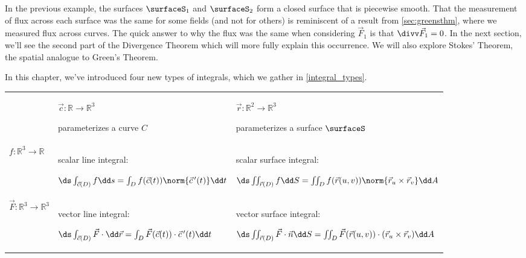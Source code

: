In the previous example, the surfaces $\surfaceS_1$ and $\surfaceS_2$ form a closed surface that is piecewise smooth. That the measurement of flux across each surface was the same for some fields (and not for others) is reminiscent of a result from \autoref{sec:greensthm}, where we measured flux across curves. The quick answer to why the flux was the same when considering $\vec F_1$ is that $\divv \vec F_1 = 0$. In the next section, we'll see the second part of the Divergence Theorem which will more fully explain this occurrence. We will also explore Stokes' Theorem, the spatial analogue to Green's Theorem.\bigskip

In this chapter, we've introduced four new types of integrals, which we gather in \autoref{integral_types}.

{
\begin{keyidea}\label{integral_types}
\renewcommand{\arraystretch}{2}
\setlength{\tabcolsep}{1.5em}
 \begin{tabular}{ l p{13em} p{17em} }\toprule
  & $\vec c:\mathbb{R}\to\mathbb{R}^3$\par parameterizes a curve $C$
  & $\vec r:\mathbb{R}^2\to\mathbb{R}^3$\par parameterizes a surface $\surfaceS$ \\\cmidrule(lr){2-2}\cmidrule(lr){3-3}
  $f:\mathbb{R}^3\to\mathbb{R}$
  & scalar line integral:\par
  $\ds\int_{\vec c(D)} f\dd s=\int_D f(\vec c(t))\norm{\vec c\,'(t)}\dd t$
  & scalar surface integral:\par
  $\ds\iint_{\vec r(D)} f\dd S=\iint_D f(\vec r(u,v))\norm{\vec r_u\times\vec r_v}\dd A$
  \\
  $\vec F:\mathbb{R}^3\to\mathbb{R}^3$
  & vector line integral:\par
  $\ds\int_{\vec c(D)}\vec F\cdot\dd\vec r=\int_D\vec F(\vec c(t))\cdot\vec c\,'(t)\dd t$
  & vector surface integral:\par
  $\ds\iint_{\vec r(D)}\vec F\cdot\vec n\dd S
  =\iint_D\vec F(\vec r(u,v))\cdot(\vec r_u\times\vec r_v)\dd A$
 \end{tabular}
\end{keyidea}
}


